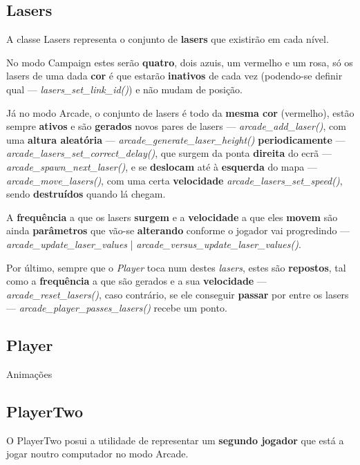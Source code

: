 \documentclass{report}
\begin{document}
\subsection{Lasers}

A classe Lasers representa o conjunto de \textbf{lasers} que existirão em cada nível. 

No modo Campaign estes serão \textbf{quatro}, dois azuis, um vermelho e um rosa, só os lasers de uma dada \textbf{cor} é que estarão \textbf{inativos} de cada vez (podendo-se definir qual --- \textit{lasers\_set\_link\_id()}) e não mudam de posição.

Já no modo Arcade, o conjunto de lasers é todo da \textbf{mesma cor} (vermelho), estão sempre \textbf{ativos} e são \textbf{gerados} novos pares de lasers --- \textit{arcade\_add\_laser()}, com uma \textbf{altura aleatória} --- \textit{arcade\_generate\_laser\_height()} \textbf{periodicamente} --- \textit{arcade\_lasers\_set\_correct\_delay()}, que surgem da ponta \textbf{direita} do ecrã --- \textit{arcade\_spawn\_next\_laser()}, e se \textbf{deslocam} até à \textbf{esquerda} do mapa --- \textit{arcade\_move\_lasers()}, com uma certa \textbf{velocidade} \textit{arcade\_lasers\_set\_speed()}, sendo \textbf{destruídos} quando lá chegam.

A \textbf{frequência} a que os lasers \textbf{surgem} e a \textbf{velocidade} a que eles \textbf{movem} são ainda \textbf{parâmetros} que vão-se \textbf{alterando} conforme o jogador vai progredindo --- \textit{arcade\_update\_laser\_values} | \textit{arcade\_versus\_update\_laser\_values()}.

Por último, sempre que o \textit{Player} toca num destes \textit{lasers}, estes são \textbf{repostos}, tal como a \textbf{frequência} a que são gerados e a sua \textbf{velocidade} --- \textit{arcade\_reset\_lasers()}, caso contrário, se ele conseguir \textbf{passar} por entre os lasers --- \textit{arcade\_player\_passes\_lasers()} recebe um ponto.

\subsection{Player}

Animações

\subsection{PlayerTwo}

O PlayerTwo posui a utilidade de representar um \textbf{segundo jogador} que está a jogar noutro computador no modo Arcade. 
\end{document}
